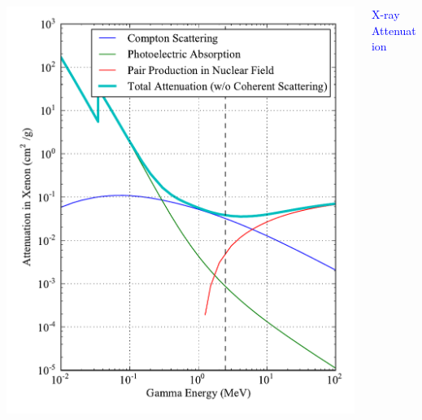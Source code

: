 \documentclass{beamer}
\begin{document}
\begin{frame}
\begin{columns}
\begin{column}{0.75\textwidth}
\includegraphics[keepaspectratio=true,width=\textwidth]{XrayAttenuationXenon.pdf}
\end{column}
\begin{column}{0.25\textwidth}
\textcolor{blue}{X-ray Attenuation}
\end{column}
\end{columns}
\end{frame}
\end{document}
